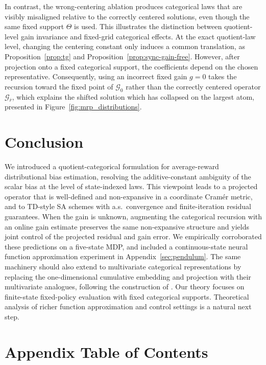 \documentclass{article}
\begin{document}
In contrast, the wrong-centering ablation produces categorical laws that are visibly misaligned relative to the correctly centered solutions, even though the same fixed support $\Theta$ is used. This illustrates the distinction between quotient-level gain invariance and fixed-grid categorical effects. At the exact quotient-law level, changing the centering constant only induces a common translation, as Proposition~\ref{prop:tg} and Proposition~\ref{prop:sync-gain-free}. However, after projection onto a fixed categorical support, the coefficients depend on the chosen representative. Consequently, using an incorrect fixed gain $g=0$ takes the recursion toward the fixed point of $\mathcal G_0$ rather than the correctly centered operator $\mathcal G_{\bar r}$, which explains the shifted solution which has collapsed on the largest atom, presented in Figure~\ref{fig:mrp_distributions}.

\section{Conclusion}

We introduced a quotient-categorical formulation for average-reward distributional bias estimation, resolving the additive-constant ambiguity of the scalar bias at the level of state-indexed laws. This viewpoint leads to a projected operator that is well-defined and non-expansive in a coordinate Cram\'er metric, and to TD-style SA schemes with a.s.\ convergence and finite-iteration residual guarantees. When the gain is unknown, augmenting the categorical recursion with an online gain estimate preserves the same non-expansive structure and yields joint control of the projected residual and gain error. We empirically corroborated these predictions on a five-state MDP, and included a continuous-state neural function approximation experiment in Appendix~\ref{sec:pendulum}. The same machinery should also extend to multivariate categorical representations by replacing the one-dimensional cumulative embedding and projection with their multivariate analogues, following the construction of \citet{kaya2026finiteiterationtheoryasynchronouscategorical}. Our theory focuses on finite-state fixed-policy evaluation with fixed categorical supports. Theoretical analysis of richer function approximation and control settings is a natural next step.




\newpage


\newpage
\appendix
\section*{Appendix Table of Contents}
\startcontents[appendix]
\end{document}
